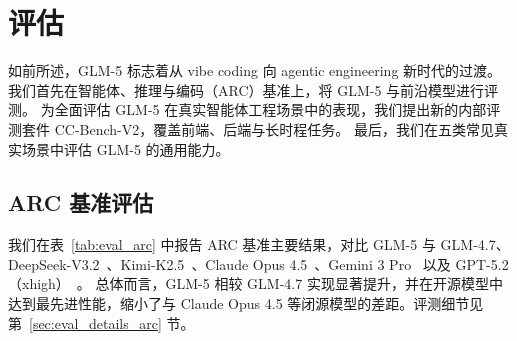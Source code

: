 

\section{评估}
\label{sec:evaluation}


如前所述，GLM-5 标志着从 vibe coding 向 agentic engineering 新时代的过渡。
我们首先在智能体、推理与编码（ARC）基准上，将 GLM-5 与前沿模型进行评测。
为全面评估 GLM-5 在真实智能体工程场景中的表现，我们提出新的内部评测套件 CC-Bench-V2，覆盖前端、后端与长时程任务。
最后，我们在五类常见真实场景中评估 GLM-5 的通用能力。


\subsection{ARC 基准评估}

我们在表~\ref{tab:eval_arc} 中报告 ARC 基准主要结果，对比 GLM-5 与 GLM-4.7、DeepSeek-V3.2~\cite{liu2025deepseek}、Kimi-K2.5~\cite{team2026kimi}、Claude Opus 4.5~\cite{opus4.5}、Gemini 3 Pro~\cite{gemini3} 以及 GPT-5.2（xhigh）~\cite{gpt-5.2}。
总体而言，GLM-5 相较 GLM-4.7 实现显著提升，并在开源模型中达到最先进性能，缩小了与 Claude Opus 4.5 等闭源模型的差距。评测细节见第~\ref{sec:eval_details_arc} 节。

